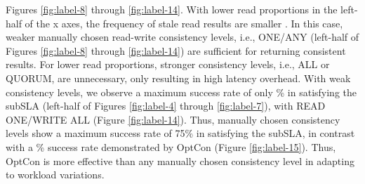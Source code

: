 \documentclass[conference]{IEEEtran}
\begin{document}
  Figures \ref{fig:label-8} through \ref{fig:label-14}. With lower read proportions in the left-half of the x axes, the frequency of stale read results are smaller \cite{DBLP:conf/cloud/GolabRAKWG13}. In this case,
weaker manually chosen read-write consistency levels, i.e., ONE/ANY (left-half of Figures \ref{fig:label-8} through \ref{fig:label-14}) are sufficient for returning
consistent results. For lower read proportions, stronger consistency levels, i.e., ALL or QUORUM, are unnecessary,
only resulting in high latency overhead. With weak consistency levels, we observe a maximum success rate of only \% in  satisfying the subSLA (left-half of Figures \ref{fig:label-4} through \ref{fig:label-7}), with READ ONE/WRITE ALL (Figure \ref{fig:label-14}). Thus, manually chosen consistency levels show a maximum success rate of 75\% in satisfying the subSLA, in contrast with a \% success rate demonstrated by OptCon (Figure \ref{fig:label-15}).
Thus, OptCon is more effective than any manually chosen consistency level in adapting to workload variations.
\end{document}
